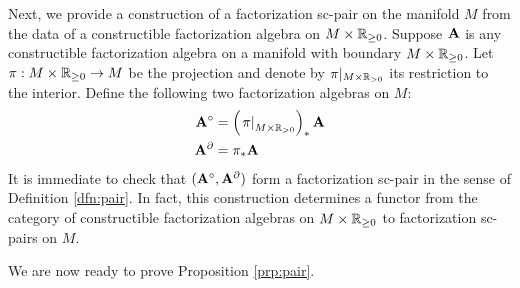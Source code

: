 \documentclass[11pt]{amsart}
\numberwithin{equation}{section}
\begin{document}
Next, we provide a construction of a factorization sc-pair on the manifold $M$ from the data of a constructible factorization algebra on $M \times \mathbb R_{\geq 0}$. 
Suppose $\mathbf A$ is any constructible factorization algebra on a manifold with boundary $M \times \mathbb R_{\geq 0}$. 
Let $\pi : M \times \mathbb R_{\geq 0} \to M$ be the projection and denote by $\pi|_{M \times \mathbb R_{>0}}$ its restriction to the interior. 
Define the following two factorization algebras on $M$:
\begin{align*}
\mathbf A^\circ & = \left(\left.\pi\right|_{M \times \mathbb R_{>0}} \right)_* \mathbf A \\
\mathbf A^\partial & = \pi_* \mathbf A
\end{align*}
It is immediate to check that $(\mathbf A^\circ, \mathbf A^\partial)$ form a factorization sc-pair in the sense of Definition \ref{dfn:pair}. 
In fact, this construction determines a functor from the category of constructible factorization algebras on $M \times \mathbb R_{\geq 0}$ to factorization sc-pairs on $M$.

We are now ready to prove Proposition \ref{prp:pair}.
\end{document}
